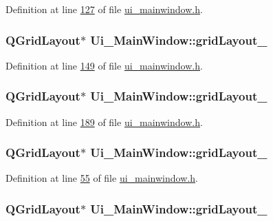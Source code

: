 Definition at line \hyperlink{a00139_source_l00127}{127} of file \hyperlink{a00139_source}{ui\+\_\+mainwindow.\+h}.

\hypertarget{a00080_adbbd44debcfc24db144006951bf7b3e1}{
\subsubsection[{grid\+Layout\+\_\+12}]{\setlength{\rightskip}{0pt plus 5cm}Q\+Grid\+Layout$\ast$ Ui\+\_\+\+Main\+Window\+::grid\+Layout\+\_}}\label{a00080_adbbd44debcfc24db144006951bf7b3e1}


Definition at line \hyperlink{a00139_source_l00149}{149} of file \hyperlink{a00139_source}{ui\+\_\+mainwindow.\+h}.

\hypertarget{a00080_aa9ccdb529e4396a7c1d52c07add8e4ab}{
\subsubsection[{grid\+Layout\+\_\+153}]{\setlength{\rightskip}{0pt plus 5cm}Q\+Grid\+Layout$\ast$ Ui\+\_\+\+Main\+Window\+::grid\+Layout\+\_}}\label{a00080_aa9ccdb529e4396a7c1d52c07add8e4ab}


Definition at line \hyperlink{a00139_source_l00189}{189} of file \hyperlink{a00139_source}{ui\+\_\+mainwindow.\+h}.

\hypertarget{a00080_a6b2a0c5f7e8ff2a87134908dd770d2d2}{
\subsubsection[{grid\+Layout\+\_\+2}]{\setlength{\rightskip}{0pt plus 5cm}Q\+Grid\+Layout$\ast$ Ui\+\_\+\+Main\+Window\+::grid\+Layout\+\_}}\label{a00080_a6b2a0c5f7e8ff2a87134908dd770d2d2}


Definition at line \hyperlink{a00139_source_l00055}{55} of file \hyperlink{a00139_source}{ui\+\_\+mainwindow.\+h}.

\hypertarget{a00080_af42ea7d4c2e893181caad21e28166932}{
\subsubsection[{grid\+Layout\+\_\+3}]{\setlength{\rightskip}{0pt plus 5cm}Q\+Grid\+Layout$\ast$ Ui\+\_\+\+Main\+Window\+::grid\+Layout\+\_}}\label{a00080_af42ea7d4c2e893181caad21e28166932}


